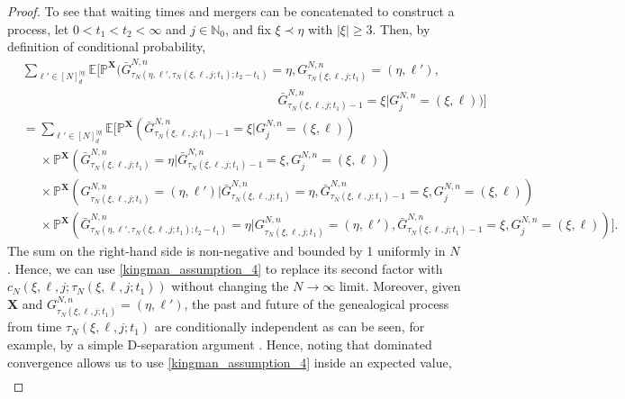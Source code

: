 \documentclass[a4paper,11pt]{article}
\theoremstyle{definition}
\newcommand{\bbP}{\mathbb{P}}
\newcommand{\bbN}{\mathbb{N}}
\newcommand{\bbE}{\mathbb{E}}
\newcommand{\bfX}{\mathbf{X}}
\begin{document}
\begin{proof}
To see that waiting times and mergers can be concatenated to construct a process, let $0 < t_1 < t_2 < \infty$ and $j \in \bbN_0$, and fix $\xi \prec \eta$ with $| \xi | \geq 3$.
Then, by definition of conditional probability,
\begin{align*}
&\sum_{ \ell' \in [ N ]_d^{ | \eta | } } \bbE[ \bbP^{ \bfX }( \bar{ G }_{ \tau_N( \eta, \ell', \tau_N( \xi, \ell, j; t_1 ); t_2 - t_1 ) }^{ N, n } = \eta, G_{ \tau_N( \xi, \ell, j; t_1 ) }^{ N, n } = ( \eta, \ell' ), \\
&\phantom{\bbE[ \bbP^{ \bfX }( \bar{ G }_{ \tau_N( \eta, \ell', \tau_N( \xi, \ell, j; t_1 ); t_2 - t_1 ) }^{ N, n } = \eta, } \mspace{67mu} \bar{ G }_{ \tau_N( \xi, \ell, j; t_1 ) - 1 }^{ N, n } = \xi | G_j^{ N, n } = ( \xi, \ell ) ) ]  \\
&= \sum_{ \ell' \in [ N ]_d^{ | \eta | } } \bbE[ \bbP^{ \bfX }( \bar{ G }_{ \tau_N( \xi, \ell, j; t_1 ) - 1 }^{ N, n } = \xi | G_j^{ N, n } = ( \xi, \ell ) ) \\
&\phantom{=} \times \bbP^{ \bfX }( \bar{ G }_{ \tau_N( \xi, \ell, j; t_1 ) }^{ N, n } = \eta | \bar{ G }_{ \tau_N( \xi, \ell, j; t_1 ) - 1 }^{ N, n } = \xi, G_j^{ N, n } = ( \xi, \ell ) ) \\
&\phantom{=} \times \bbP^{ \bfX }( G_{ \tau_N( \xi, \ell, j; t_1 ) }^{ N, n } = ( \eta, \ell' ) | \bar{ G }_{ \tau_N( \xi, \ell, j; t_1 ) }^{ N, n } = \eta, \bar{ G }_{ \tau_N( \xi, \ell, j; t_1 ) - 1 }^{ N, n } = \xi, G_j^{ N, n } = ( \xi, \ell ) ) \\
&\phantom{=} \times \bbP^{ \bfX }( \bar{ G }_{ \tau_N( \eta, \ell', \tau_N( \xi, \ell, j; t_1 ); t_2 - t_1 ) }^{ N, n } = \eta | G_{ \tau_N( \xi, \ell, j; t_1 ) }^{ N, n } = ( \eta, \ell' ), \bar{ G }_{ \tau_N( \xi, \ell, j; t_1 ) - 1 }^{ N, n } = \xi,  G_j^{ N, n } = ( \xi, \ell ) ) ].
\end{align*}
The sum on the right-hand side is non-negative and bounded by 1 uniformly in $N$.
Hence, we can use \eqref{kingman_assumption_4} to replace its second factor with $c_N(\xi, \ell, j; \tau_N( \xi, \ell, j; t_1 ) )$ without changing the $N \to \infty$ limit.
Moreover, given $\bfX$ and $G_{ \tau_N( \xi, \ell, j; t_1 ) }^{ N, n } = ( \eta, \ell' )$, the past and future of the genealogical process  from time $\tau_N( \xi, \ell, j; t_1 )$ are conditionally independent as can be seen, for example, by a simple D-separation argument \cite[Chapter 3]{pearl:1988}.
Hence, noting that dominated convergence allows us to use \eqref{kingman_assumption_4} inside an expected value,
\begin{align*}

\end{align*}
\end{proof}
\end{document}
